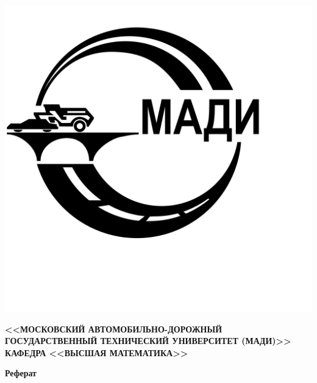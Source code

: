 \documentclass[12pt]{article}
\begin{document}
    \begin{titlepage}
        \thispagestyle{empty}
        \begin{center}
            \noindent\begin{minipage}{0.14\textwidth}
                         \includegraphics[width=\linewidth]{image/madi_logo}
            \end{minipage}%
            \begin{minipage}{0.86\textwidth}
                \center{\small{\vspace{\baselineskip}}}
            \end{minipage}
            \small{\textbf{<<МОСКОВСКИЙ АВТОМОБИЛЬНО-ДОРОЖНЫЙ ГОСУДАРСТВЕННЫЙ ТЕХНИЧЕСКИЙ УНИВЕРСИТЕТ (МАДИ)>>}}\\
            \vspace{0.2 cm}
            \scriptsize{{\textbf{КАФЕДРА <<ВЫСШАЯ МАТЕМАТИКА>> }}}
            \vspace{\baselineskip}

            \small{\textbf{Реферат}}\\
            \vspace{0.2 cm}


\end{center}
\end{titlepage}
\end{document}
